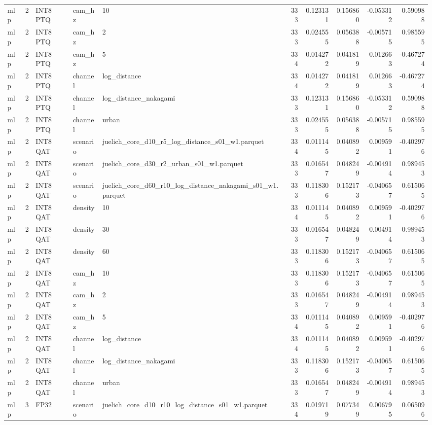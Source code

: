 \begin{tabular}{lrlllrrrrr}
mlp & 2 & INT8 PTQ & cam\_hz & 10 & 333 & 0.123131 & 0.156860 & -0.053312 & 0.590988 \\
mlp & 2 & INT8 PTQ & cam\_hz & 2 & 333 & 0.024555 & 0.056388 & -0.005715 & 0.985595 \\
mlp & 2 & INT8 PTQ & cam\_hz & 5 & 334 & 0.014272 & 0.041819 & 0.012663 & -0.467274 \\
mlp & 2 & INT8 PTQ & channel & log\_distance & 334 & 0.014272 & 0.041819 & 0.012663 & -0.467274 \\
mlp & 2 & INT8 PTQ & channel & log\_distance\_nakagami & 333 & 0.123131 & 0.156860 & -0.053312 & 0.590988 \\
mlp & 2 & INT8 PTQ & channel & urban & 333 & 0.024555 & 0.056388 & -0.005715 & 0.985595 \\
mlp & 2 & INT8 QAT & scenario & juelich\_core\_d10\_r5\_log\_distance\_s01\_w1.parquet & 334 & 0.011145 & 0.040892 & 0.009591 & -0.402976 \\
mlp & 2 & INT8 QAT & scenario & juelich\_core\_d30\_r2\_urban\_s01\_w1.parquet & 333 & 0.016547 & 0.048249 & -0.004914 & 0.989453 \\
mlp & 2 & INT8 QAT & scenario & juelich\_core\_d60\_r10\_log\_distance\_nakagami\_s01\_w1.parquet & 333 & 0.118306 & 0.152173 & -0.040657 & 0.615065 \\
mlp & 2 & INT8 QAT & density & 10 & 334 & 0.011145 & 0.040892 & 0.009591 & -0.402976 \\
mlp & 2 & INT8 QAT & density & 30 & 333 & 0.016547 & 0.048249 & -0.004914 & 0.989453 \\
mlp & 2 & INT8 QAT & density & 60 & 333 & 0.118306 & 0.152173 & -0.040657 & 0.615065 \\
mlp & 2 & INT8 QAT & cam\_hz & 10 & 333 & 0.118306 & 0.152173 & -0.040657 & 0.615065 \\
mlp & 2 & INT8 QAT & cam\_hz & 2 & 333 & 0.016547 & 0.048249 & -0.004914 & 0.989453 \\
mlp & 2 & INT8 QAT & cam\_hz & 5 & 334 & 0.011145 & 0.040892 & 0.009591 & -0.402976 \\
mlp & 2 & INT8 QAT & channel & log\_distance & 334 & 0.011145 & 0.040892 & 0.009591 & -0.402976 \\
mlp & 2 & INT8 QAT & channel & log\_distance\_nakagami & 333 & 0.118306 & 0.152173 & -0.040657 & 0.615065 \\
mlp & 2 & INT8 QAT & channel & urban & 333 & 0.016547 & 0.048249 & -0.004914 & 0.989453 \\
mlp & 3 & FP32 & scenario & juelich\_core\_d10\_r10\_log\_distance\_s01\_w1.parquet & 334 & 0.019719 & 0.077349 & 0.006795 & 0.065096 \\

\end{tabular}
